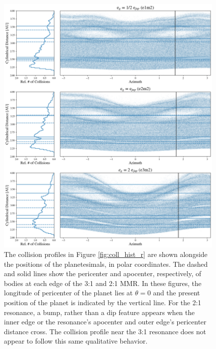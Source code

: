 \begin{figure}
    \includegraphics[width=\textwidth]{figures/grind/coll_polar_e.png}
    \caption{The collision profiles in Figure \ref{fig:coll_hist_r} are shown alongside the positions of the planetesimals, in polar 
    coordinates. The dashed and solid lines show the pericenter and apocenter, respectively,  of bodies at each edge of the 3:1 
    and 2:1 MMR. In these figures, the longitude of pericenter of the planet lies at $\theta = 0$ and the present position of the 
    planet is indicated by the vertical line. For the 2:1 resonance, a bump, rather than a dip feature appears when the inner edge 
    or the resonance's apocenter and outer edge's pericenter distance cross. The collision profile near the 3:1 resonance does not 
    appear to follow this same qualitative behavior.\label{fig:coll_polar_e}}
\end{figure}



